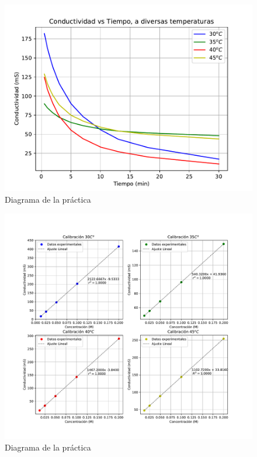 \documentclass[12pt,letterpaper]{article}
\begin{document}
     \begin{figure}[H]
         \centering
         \includegraphics[scale=1]{Figuras/Conductividad_vs_Tiempo.pdf}
         \caption{Diagrama de la pr\'{a}ctica}
      \end{figure}
%

\begin{figure}[H]
    \centering
    \includegraphics[scale=0.65]{Figuras/FiguraTodos.pdf}
    \caption{Diagrama de la pr\'{a}ctica}
\end{figure}
\end{document}
